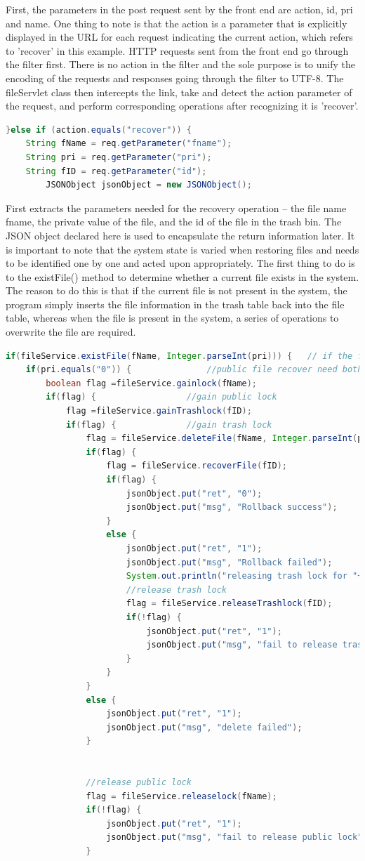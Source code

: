 \documentclass[a4paper,11pt]{article}
\begin{document}
\par First, the parameters in the post request sent by the front end are action, id, pri and name. One thing to note is that the action is a parameter that is explicitly displayed in the URL for each request indicating the current action, which refers to 'recover' in this example. HTTP requests sent from the front end go through the filter first. There is no action in the filter and the sole purpose is to unify the encoding of the requests and responses going through the filter to UTF-8. The fileServlet class then intercepts the link, take and detect the action parameter of the request, and perform corresponding operations after recognizing it is 'recover'.
\begin{lstlisting}[language=Java]
}else if (action.equals("recover")) {
	String fName = req.getParameter("fname");
	String pri = req.getParameter("pri");
	String fID = req.getParameter("id");
    	JSONObject jsonObject = new JSONObject();
\end{lstlisting}
\par First extracts the parameters needed for the recovery operation -- the file name fname, the private value of the file, and the id of the file in the trash bin. The JSON object declared here is used to encapsulate the return information later. It is important to note that the system state is varied when restoring files and needs to be identified one by one and acted upon appropriately. The first thing to do is to the existFile() method to determine whether a current file exists in the system. The reason to do this is that if the current file is not present in the system, the program simply inserts the file information in the trash table back into the file table, whereas when the file is present in the system, a series of operations to overwrite the file are required.
\begin{lstlisting}[language=Java]
if(fileService.existFile(fName, Integer.parseInt(pri))) {   // if the file existed
	if(pri.equals("0")) {				//public file recover need both lock
		boolean flag =fileService.gainlock(fName);
		if(flag) {					//gain public lock
			flag =fileService.gainTrashlock(fID);
			if(flag) {				//gain trash lock
				flag = fileService.deleteFile(fName, Integer.parseInt(pri));
				if(flag) {
					flag = fileService.recoverFile(fID);
					if(flag) {
						jsonObject.put("ret", "0");
						jsonObject.put("msg", "Rollback success");
					}
					else {
						jsonObject.put("ret", "1");
						jsonObject.put("msg", "Rollback failed");
						System.out.println("releasing trash lock for "+fID);
						//release trash lock 
						flag = fileService.releaseTrashlock(fID);
						if(!flag) {
							jsonObject.put("ret", "1");
							jsonObject.put("msg", "fail to release trash lock");
						}
					}
				}
				else {
					jsonObject.put("ret", "1");
					jsonObject.put("msg", "delete failed");
				}
				
				
				//release public lock
				flag = fileService.releaselock(fName);
				if(!flag) {
					jsonObject.put("ret", "1");
					jsonObject.put("msg", "fail to release public lock");
				}
\end{lstlisting}
\end{document}
